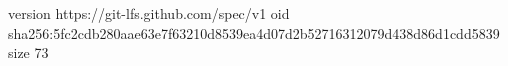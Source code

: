 version https://git-lfs.github.com/spec/v1
oid sha256:5fc2cdb280aae63e7f63210d8539ea4d07d2b52716312079d438d86d1cdd5839
size 73
